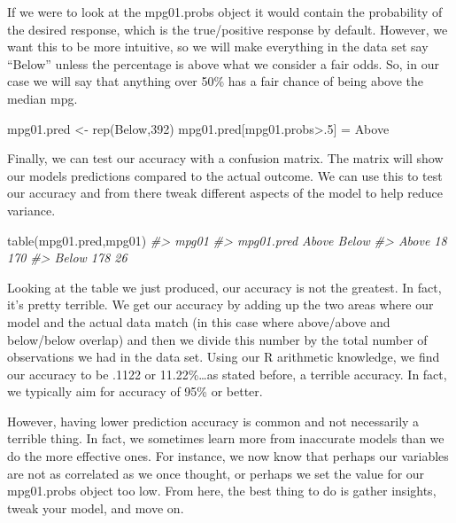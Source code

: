 \documentclass[
]{book}
\newenvironment{Shaded}{\begin{snugshade}}{\end{snugshade}}
\newcommand{\CommentTok}[1]{\textcolor[rgb]{0.56,0.35,0.01}{\textit{#1}}}
\newcommand{\DecValTok}[1]{\textcolor[rgb]{0.00,0.00,0.81}{#1}}
\newcommand{\FunctionTok}[1]{\textcolor[rgb]{0.00,0.00,0.00}{#1}}
\newcommand{\NormalTok}[1]{#1}
\newcommand{\OtherTok}[1]{\textcolor[rgb]{0.56,0.35,0.01}{#1}}
\newcommand{\SpecialCharTok}[1]{\textcolor[rgb]{0.00,0.00,0.00}{#1}}
\newcommand{\StringTok}[1]{\textcolor[rgb]{0.31,0.60,0.02}{#1}}
\begin{document}
If we were to look at the mpg01.probs object it would contain the probability of the desired response, which is the true/positive response by default. However, we want this to be more intuitive, so we will make everything in the data set say ``Below'' unless the percentage is above what we consider a fair odds. So, in our case we will say that anything over 50\% has a fair chance of being above the median mpg.

\begin{Shaded}
\begin{Highlighting}[]
\NormalTok{mpg01.pred }\OtherTok{\textless{}{-}} \FunctionTok{rep}\NormalTok{(}\StringTok{\textquotesingle{}Below\textquotesingle{}}\NormalTok{,}\DecValTok{392}\NormalTok{)}
\NormalTok{mpg01.pred[mpg01.probs}\SpecialCharTok{\textgreater{}}\NormalTok{.}\DecValTok{5}\NormalTok{] }\OtherTok{=} \StringTok{\textquotesingle{}Above\textquotesingle{}}
\end{Highlighting}
\end{Shaded}

Finally, we can test our accuracy with a confusion matrix. The matrix will show our models predictions compared to the actual outcome. We can use this to test our accuracy and from there tweak different aspects of the model to help reduce variance.

\begin{Shaded}
\begin{Highlighting}[]
\FunctionTok{table}\NormalTok{(mpg01.pred,mpg01)}
\CommentTok{\#\textgreater{}           mpg01}
\CommentTok{\#\textgreater{} mpg01.pred Above Below}
\CommentTok{\#\textgreater{}      Above    18   170}
\CommentTok{\#\textgreater{}      Below   178    26}
\end{Highlighting}
\end{Shaded}

Looking at the table we just produced, our accuracy is not the greatest. In fact, it's pretty terrible. We get our accuracy by adding up the two areas where our model and the actual data match (in this case where above/above and below/below overlap) and then we divide this number by the total number of observations we had in the data set. Using our R arithmetic knowledge, we find our accuracy to be .1122 or 11.22\%\ldots as stated before, a terrible accuracy. In fact, we typically aim for accuracy of 95\% or better.

However, having lower prediction accuracy is common and not necessarily a terrible thing. In fact, we sometimes learn more from inaccurate models than we do the more effective ones. For instance, we now know that perhaps our variables are not as correlated as we once thought, or perhaps we set the value for our mpg01.probs object too low. From here, the best thing to do is gather insights, tweak your model, and move on.
\end{document}
